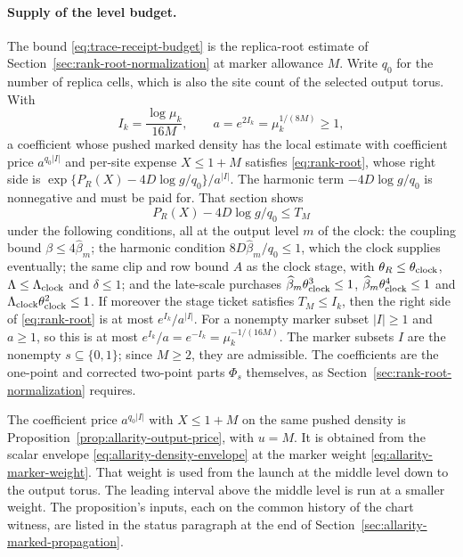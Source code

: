 \paragraph{Supply of the level budget.}
The bound \eqref{eq:trace-receipt-budget} is the replica-root estimate of
Section~\ref{sec:rank-root-normalization} at marker allowance $M$. Write
$q_0$ for the number of replica cells, which is also the site count of
the selected output torus. With
\[
 I_k=\frac{\log\mu_k}{16M},\qquad a=e^{2I_k}=\mu_k^{1/(8M)}\ge1 ,
\]
a coefficient whose pushed marked density has the local estimate with
coefficient price $a^{q_0|I|}$ and per-site expense $X\le1+M$ satisfies
\eqref{eq:rank-root}, whose right side is
$\exp\{P_R(X)-4D\log g/q_0\}/a^{|I|}$. The harmonic term
$-4D\log g/q_0$ is nonnegative and must be paid for. That section shows
\[
 P_R(X)-4D\log g/q_0\le T_M
\]
under the following conditions, all at the output level $m$ of the clock:
the coupling bound $\beta\le4\widehat\beta_m$; the harmonic condition
$8D\widehat\beta_m/q_0\le1$, which the clock supplies eventually; the
same clip and row bound $A$ as the clock stage, with
$\theta_R\le\theta_{\rm clock}$, $\Lambda\le\Lambda_{\rm clock}$ and
$\delta\le1$; and the late-scale purchases
$\widehat\beta_m\theta_{\rm clock}^3\le1$,
$\widehat\beta_m\theta_{\rm clock}^4\le1$ and
$\Lambda_{\rm clock}\theta_{\rm clock}^2\le1$. If moreover the stage ticket
satisfies $T_M\le I_k$, then the right side of \eqref{eq:rank-root} is
at most $e^{I_k}/a^{|I|}$. For a nonempty marker subset $|I|\ge1$ and
$a\ge1$, so this is at most $e^{I_k}/a=e^{-I_k}=\mu_k^{-1/(16M)}$. The
marker subsets $I$ are the nonempty $s\subseteq\{0,1\}$; since
$M\ge2$, they are admissible. The coefficients are the one-point and
corrected two-point parts $\Phi_s$ themselves, as
Section~\ref{sec:rank-root-normalization} requires.

The coefficient price $a^{q_0|I|}$ with $X\le1+M$ on the same pushed
density is Proposition~\ref{prop:allarity-output-price}, with $u=M$. It
is obtained from the scalar envelope \eqref{eq:allarity-density-envelope}
at the marker weight \eqref{eq:allarity-marker-weight}. That weight is
used from the launch at the middle level down to the output torus. The
leading interval above the middle level is run at a smaller weight. The
proposition's inputs, each on the common history of the chart witness,
are listed in the status paragraph at the end of
Section~\ref{sec:allarity-marked-propagation}.

